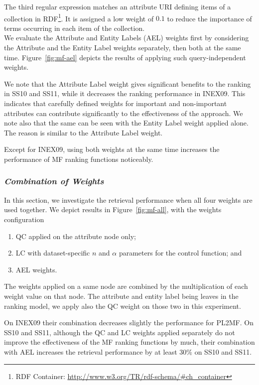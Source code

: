The third regular expression matches an attribute URI defining items of a collection in RDF\footnote{RDF Container: \url{http://www.w3.org/TR/rdf-schema/\#ch\_container}}. It is assigned a low weight of $0.1$ to reduce the importance of terms occurring in each item of the collection.\\

We evaluate the Attribute and Entity Labels (AEL) weights first by considering the Attribute and the Entity Label weights separately, then both at the same time. Figure~\ref{fig:mf-ael} depicts the results of applying such query-independent weights.

We note that the Attribute Label weight gives significant benefits to the ranking in SS10 and SS11, while it decreases the ranking performance in INEX09. This indicates that carefully defined weights for important and non-important attributes can contribute significantly to the effectiveness of the approach. We note also that the same can be seen with the Entity Label weight applied alone. The reason is similar to the Attribute Label weight.

Except for INEX09, using both weights at the same time increases the performance of \gls{MF} ranking functions noticeably.

\subsubsection{\emph{Combination of Weights}}
\label{sec:combi-weight-effect}

In this section, we investigate the retrieval performance when all four weights are used together. We depict results in Figure~\ref{fig:mf-all}, with the weights configuration
\begin{enumerate}
    \item QC applied on the attribute node only;
    \item LC with dataset-specific $n$ and $\alpha$ parameters for the control function; and
    \item AEL weights.
\end{enumerate}

The weights applied on a same node are combined by the multiplication of each weight value on that node.
The attribute and entity label being leaves in the ranking model, we apply also the QC weight on those two in this experiment.

On INEX09 their combination decreases slightly the performance for \gls{PL2MF}. On SS10 and SS11, although the QC and LC weights applied separately do not improve the effectiveness of the \gls{MF} ranking functions by much, their combination with AEL increases the retrieval performance by at least $30\%$ on SS10 and SS11.


